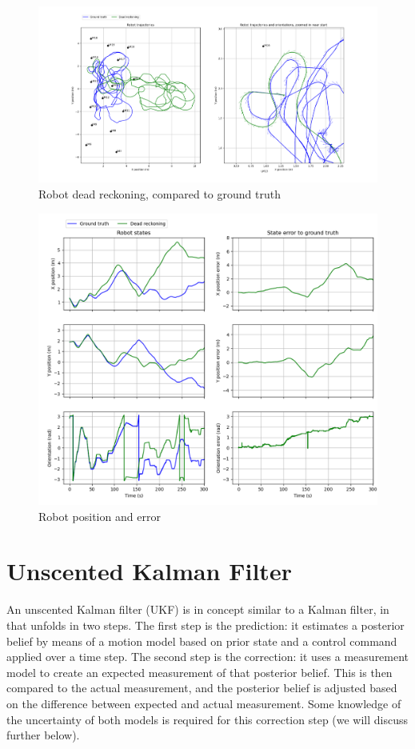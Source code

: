 \documentclass{article}
\begin{document}
\begin{figure}
\centering
\includegraphics[scale=0.3]{Figure_2.png}
\caption{Robot dead reckoning, compared to ground truth}
\label{fig:figure2}
\end{figure}

\begin{figure}
\centering
\includegraphics[scale=0.3]{Figure_3.png}
\caption{Robot position and error}
\label{fig:figure3}
\end{figure}

\section{Unscented Kalman Filter}

An unscented Kalman filter (UKF) is in concept similar to a Kalman filter, in that unfolds in two steps. The first step is the prediction: it estimates a posterior belief by means of a motion model based on prior state and a control command applied over a time step. The second step is the correction: it uses a measurement model to create an expected measurement of that posterior belief. This is then compared to the actual measurement, and the posterior belief is adjusted based on the difference between expected and actual measurement. Some knowledge of the uncertainty of both models is required for this correction step (we will discuss further below).
\end{document}
